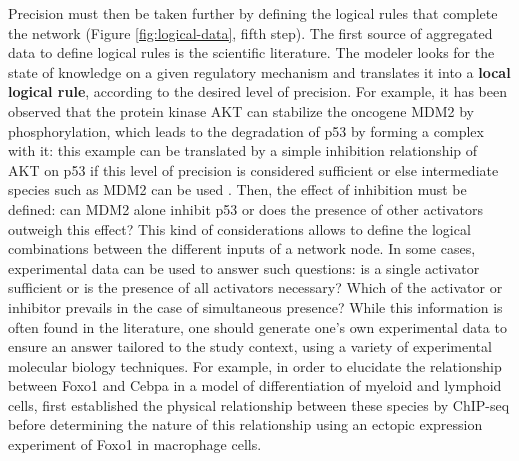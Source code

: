 \documentclass[a4paper,12pt,twoside,onecolumn,openright,final,oldfontcommands]{memoir}
\begin{document}
Precision must then be taken further by defining the logical rules that
complete the network (Figure \ref{fig:logical-data}, fifth step). The
first source of aggregated data to define logical rules is the
scientific literature. The modeler looks for the state of knowledge on a
given regulatory mechanism and translates it into a \textbf{local
logical rule}, according to the desired level of precision. For example,
it has been observed that the protein kinase AKT can stabilize the
oncogene MDM2 by phosphorylation, which leads to the degradation of p53
by forming a complex with it: this example can be translated by a simple
inhibition relationship of AKT on p53 if this level of precision is
considered sufficient or else intermediate species such as MDM2 can be
used \citep{cohen2015mathematical}. Then, the effect of inhibition must
be defined: can MDM2 alone inhibit p53 or does the presence of other
activators outweigh this effect? This kind of considerations allows to
define the logical combinations between the different inputs of a
network node. In some cases, experimental data can be used to answer
such questions: is a single activator sufficient or is the presence of
all activators necessary? Which of the activator or inhibitor prevails
in the case of simultaneous presence? While this information is often
found in the literature, one should generate one's own experimental data
to ensure an answer tailored to the study context, using a variety of
experimental molecular biology techniques. For example, in order to
elucidate the relationship between Foxo1 and Cebpa in a model of
differentiation of myeloid and lymphoid cells,
\citet{collombet2017logical} first established the physical relationship
between these species by ChIP-seq before determining the nature of this
relationship using an ectopic expression experiment of Foxo1 in
macrophage cells.
\end{document}
